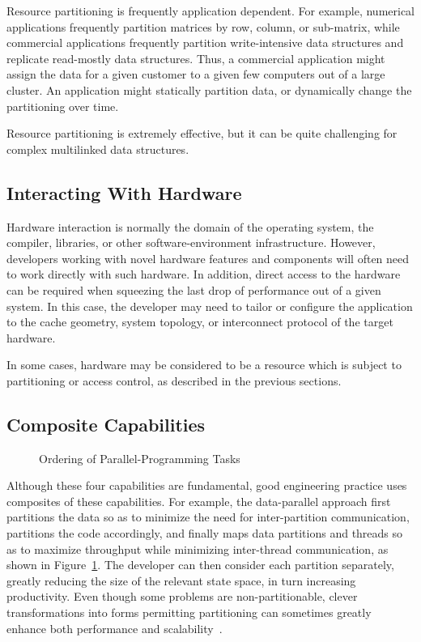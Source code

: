 Resource partitioning is frequently application dependent.
For example, numerical applications frequently partition matrices
by row, column, or sub-matrix, while commercial applications frequently
partition write-intensive data structures and replicate
read-mostly data structures.
Thus, a commercial application might assign the data for a
given customer to a given few computers out of a large cluster.
An application might statically partition data, or dynamically
change the partitioning over time.

Resource partitioning is extremely effective, but
it can be quite challenging for complex multilinked data
structures.

\subsection{Interacting With Hardware}
\label{sec:Interacting With Hardware}

Hardware interaction is normally the domain of the operating system,
the compiler, libraries, or other software-environment infrastructure.
However, developers working with novel hardware features and components
will often need to work directly with such hardware.
In addition, direct access to the hardware can be required when squeezing
the last drop of performance out of a given system.
In this case, the developer may need to tailor or configure the application
to the cache geometry, system topology, or interconnect protocol of the
target hardware.

In some cases, hardware may be considered to be a resource which
is subject to partitioning or access control, as described in
the previous sections.

\subsection{Composite Capabilities}
\label{sec:Composite Capabilities}

\begin{figure}[tb]
\begin{center}
\end{center}
\caption{Ordering of Parallel-Programming Tasks}
\label{fig:intro:Ordering of Parallel-Programming Tasks}
\end{figure}

Although these four capabilities are fundamental,
good engineering practice uses composites of
these capabilities.
For example, the data-parallel approach first
partitions the data so as to minimize the need for
inter-partition communication, partitions the code accordingly,
and finally maps data partitions and threads so as to maximize
throughput while minimizing inter-thread communication,
as shown in
Figure~\ref{fig:intro:Ordering of Parallel-Programming Tasks}.
The developer can then
consider each partition separately, greatly reducing the size
of the relevant state space, in turn increasing productivity.
Even though some problems are non-partitionable,
clever transformations into forms permitting partitioning can
sometimes greatly enhance
both performance and scalability~\cite{PanagiotisMetaxas1999PDCS}.

